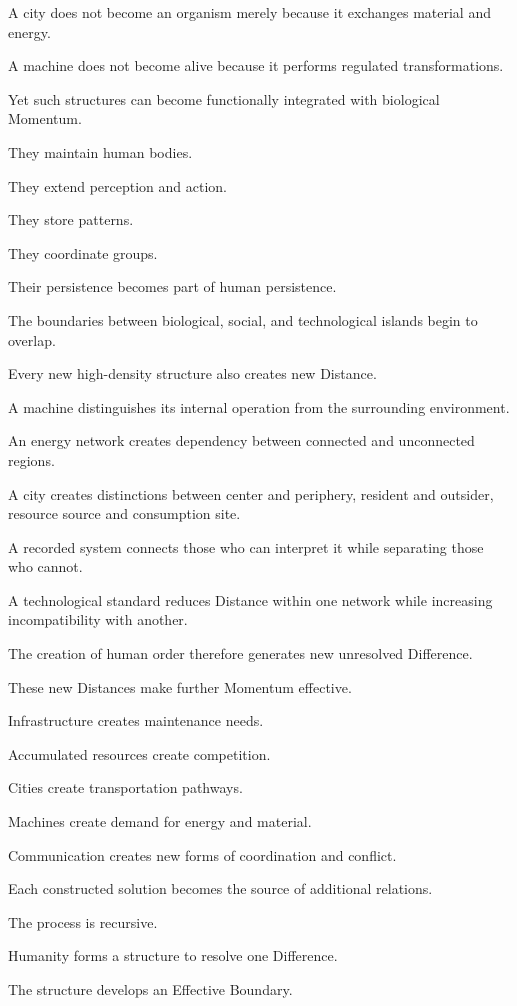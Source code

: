 A city does not become an organism merely because it exchanges material and energy.

A machine does not become alive because it performs regulated transformations.

Yet such structures can become functionally integrated with biological Momentum.

They maintain human bodies.

They extend perception and action.

They store patterns.

They coordinate groups.

Their persistence becomes part of human persistence.

The boundaries between biological, social, and technological islands begin to overlap.

Every new high-density structure also creates new Distance.

A machine distinguishes its internal operation from the surrounding environment.

An energy network creates dependency between connected and unconnected regions.

A city creates distinctions between center and periphery, resident and outsider, resource source and consumption site.

A recorded system connects those who can interpret it while separating those who cannot.

A technological standard reduces Distance within one network while increasing incompatibility with another.

The creation of human order therefore generates new unresolved Difference.

These new Distances make further Momentum effective.

Infrastructure creates maintenance needs.

Accumulated resources create competition.

Cities create transportation pathways.

Machines create demand for energy and material.

Communication creates new forms of coordination and conflict.

Each constructed solution becomes the source of additional relations.

The process is recursive.

Humanity forms a structure to resolve one Difference.

The structure develops an Effective Boundary.

